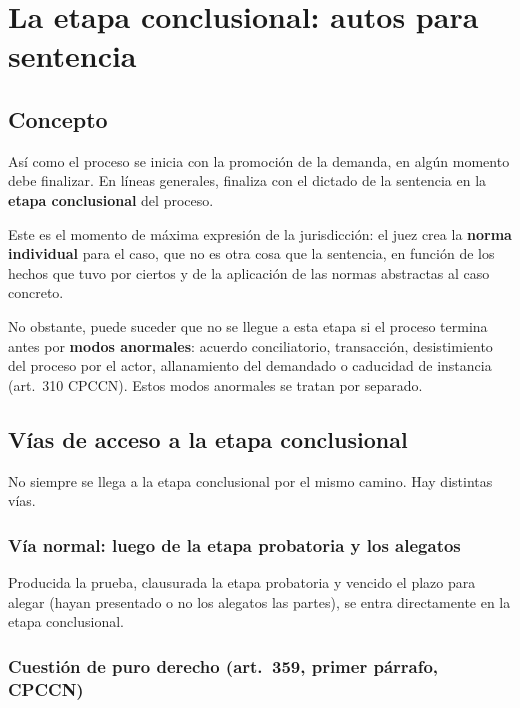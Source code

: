 \documentclass[12pt,oneside]{book}
\begin{document}
\chapter[Etapa conclusional]{La etapa conclusional: autos para sentencia}\label{cap:conclusional}


\section{Concepto}

Así como el proceso se inicia con la promoción de la demanda, en algún momento debe finalizar. En líneas generales, finaliza con el dictado de la sentencia en la \textbf{etapa conclusional} del proceso.

Este es el momento de máxima expresión de la jurisdicción: el juez crea la \textbf{norma individual} para el caso, que no es otra cosa que la sentencia, en función de los hechos que tuvo por ciertos y de la aplicación de las normas abstractas al caso concreto.

No obstante, puede suceder que no se llegue a esta etapa si el proceso termina antes por \textbf{modos anormales}: acuerdo conciliatorio, transacción, desistimiento del proceso por el actor, allanamiento del demandado o caducidad de instancia (art.~310 CPCCN). Estos modos anormales se tratan por separado.

\section{Vías de acceso a la etapa conclusional}

No siempre se llega a la etapa conclusional por el mismo camino. Hay distintas vías.

\subsection{Vía normal: luego de la etapa probatoria y los alegatos}

Producida la prueba, clausurada la etapa probatoria y vencido el plazo para alegar (hayan presentado o no los alegatos las partes), se entra directamente en la etapa conclusional.

\subsection{Cuestión de puro derecho (art.~359, primer párrafo, CPCCN)}
\end{document}
